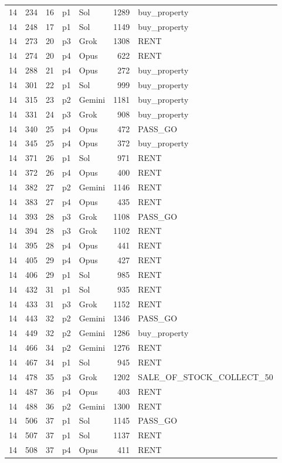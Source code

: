 \begin{longtable}{r r r l l r >{\ttfamily}l}
14 & 234 & 16 & p1 & Sol & 1289 & buy\_property \\
14 & 248 & 17 & p1 & Sol & 1149 & buy\_property \\
14 & 273 & 20 & p3 & Grok & 1308 & RENT \\
14 & 274 & 20 & p4 & Opus & 622 & RENT \\
14 & 288 & 21 & p4 & Opus & 272 & buy\_property \\
14 & 301 & 22 & p1 & Sol & 999 & buy\_property \\
14 & 315 & 23 & p2 & Gemini & 1181 & buy\_property \\
14 & 331 & 24 & p3 & Grok & 908 & buy\_property \\
14 & 340 & 25 & p4 & Opus & 472 & PASS\_GO \\
14 & 345 & 25 & p4 & Opus & 372 & buy\_property \\
14 & 371 & 26 & p1 & Sol & 971 & RENT \\
14 & 372 & 26 & p4 & Opus & 400 & RENT \\
14 & 382 & 27 & p2 & Gemini & 1146 & RENT \\
14 & 383 & 27 & p4 & Opus & 435 & RENT \\
14 & 393 & 28 & p3 & Grok & 1108 & PASS\_GO \\
14 & 394 & 28 & p3 & Grok & 1102 & RENT \\
14 & 395 & 28 & p4 & Opus & 441 & RENT \\
14 & 405 & 29 & p4 & Opus & 427 & RENT \\
14 & 406 & 29 & p1 & Sol & 985 & RENT \\
14 & 432 & 31 & p1 & Sol & 935 & RENT \\
14 & 433 & 31 & p3 & Grok & 1152 & RENT \\
14 & 443 & 32 & p2 & Gemini & 1346 & PASS\_GO \\
14 & 449 & 32 & p2 & Gemini & 1286 & buy\_property \\
14 & 466 & 34 & p2 & Gemini & 1276 & RENT \\
14 & 467 & 34 & p1 & Sol & 945 & RENT \\
14 & 478 & 35 & p3 & Grok & 1202 & SALE\_OF\_STOCK\_COLLECT\_50 \\
14 & 487 & 36 & p4 & Opus & 403 & RENT \\
14 & 488 & 36 & p2 & Gemini & 1300 & RENT \\
14 & 506 & 37 & p1 & Sol & 1145 & PASS\_GO \\
14 & 507 & 37 & p1 & Sol & 1137 & RENT \\
14 & 508 & 37 & p4 & Opus & 411 & RENT \\

\end{longtable}
